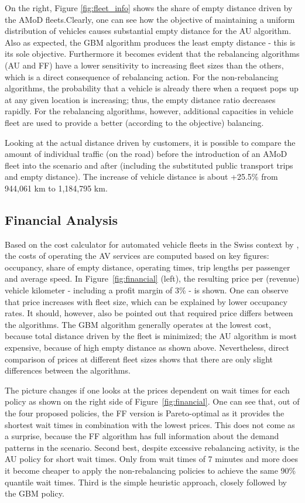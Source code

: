 On the right, Figure \ref{fig:fleet_info} shows the share of empty distance driven by the AMoD fleets.Clearly, one can see how the objective of maintaining a uniform distribution of vehicles causes substantial empty distance for the AU algorithm. Also as expected, the GBM algorithm produces the least  empty distance - this is its sole objective. Furthermore it becomes evident that the rebalancing algorithms (AU and FF) have a lower sensitivity to increasing fleet sizes than the others, which is a direct consequence of rebalancing action. For the non-rebalancing algorithms, the probability that a vehicle is already there when a request pops up at any given location is increasing; thus, the empty distance ratio decreases rapidly. For the rebalancing algorithms, however, additional capacities in vehicle fleet are used to provide a better (according to the objective) balancing.


Looking at the actual distance driven by customers, it is possible to compare the amount of individual traffic (on the road) before the introduction of an AMoD fleet into the scenario and after (including the substituted public transport trips and empty distance). The increase of vehicle distance is about +25.5\% from 944,061 km to 1,184,795 km.

\subsection{Financial Analysis}
\label{sec:cost_analysis}

Based on the cost calculator for automated vehicle fleets in the Swiss context by \citet{Bosch2016a}, the costs of operating the AV services are computed based on key figures: occupancy, share of empty distance, operating times, trip lengths per passenger and average speed. In Figure~\ref{fig:financial} (left), the resulting price per (revenue) vehicle kilometer - including a profit margin of 3\% - is shown. One can observe that price increases with fleet size, which can be explained by lower occupancy rates. It should, however, also be pointed out that required price differs between the algorithms. The GBM algorithm generally operates at the lowest cost, because total distance driven by the fleet is minimized; the AU algorithm is most expensive, because of high empty distance as shown above. Nevertheless, direct comparison of prices at different fleet sizes shows that there are only slight differences between the algorithms.


The picture changes if one looks at the prices dependent on wait times for each policy as shown on the right side of Figure~\ref{fig:financial}. One can see that, out of the four proposed policies, the FF version is Pareto-optimal as it provides the shortest wait times in combination with the lowest prices. This does not come as a surprise, because the FF algorithm has full information about the demand patterns in the scenario. Second best, despite excessive rebalancing activity, is the AU policy for short wait times. Only from wait times of 7 minutes and more does it become cheaper to apply the non-rebalancing policies to achieve the same 90\% quantile wait times. Third is the simple heuristic approach, closely followed by the GBM policy.


